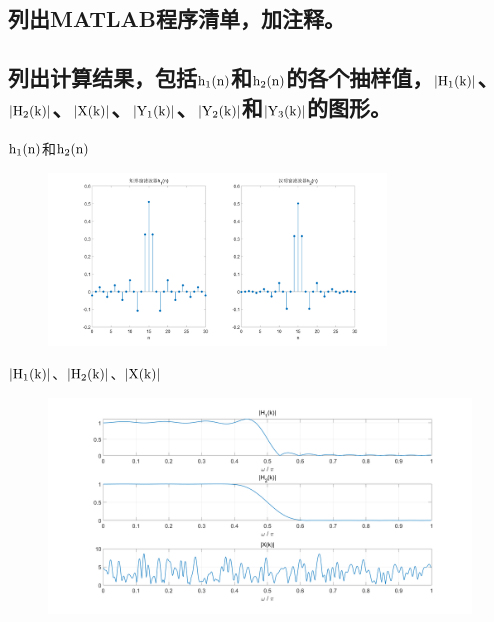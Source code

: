 \documentclass{../source/Experiment}
\begin{document}
        \subsection{列出MATLAB程序清单，加注释。}

            

        \subsection{列出计算结果，包括$\rm h_1(n)$和$\rm h_2(n)$的各个抽样值，$\rm |H_1(k)|$、$\rm |H_2(k)|$、$\rm |X(k)|$、$\rm |Y_1(k)|$、$\rm |Y_2(k)|$和$\rm |Y_3(k)|$的图形。}

        $\rm h_1(n)$和$\rm h_2(n)$
        \begin{figure}[H]
            \centering
            \includegraphics[width = 0.8\textwidth]{src/exp4-5-2-1.png}
        \end{figure}

        $\rm |H_1(k)|$、$\rm |H_2(k)|$、$\rm |X(k)|$
        \begin{figure}[H]
            \centering
            \includegraphics[width = 1\textwidth]{src/exp4-5-2-2.png}
        \end{figure}
\end{document}
